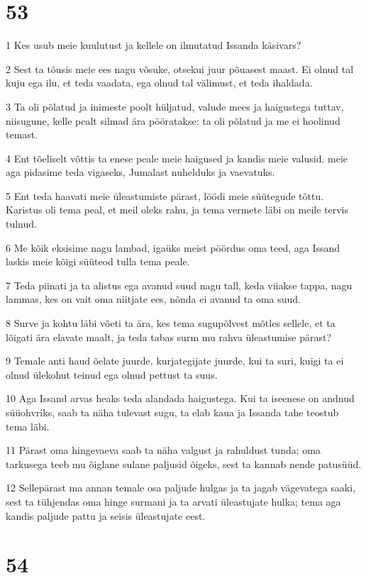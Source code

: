 \chapter{53}

\par 1 Kes usub meie kuulutust ja kellele on ilmutatud Issanda käsivars?
\par 2 Sest ta tõusis meie ees nagu võsuke, otsekui juur põuasest maast. Ei olnud tal kuju ega ilu, et teda vaadata, ega olnud tal välimust, et teda ihaldada.
\par 3 Ta oli põlatud ja inimeste poolt hüljatud, valude mees ja haigustega tuttav, niisugune, kelle pealt silmad ära pööratakse: ta oli põlatud ja me ei hoolinud temast.
\par 4 Ent tõeliselt võttis ta enese peale meie haigused ja kandis meie valusid. meie aga pidasime teda vigaseks, Jumalast nuhelduks ja vaevatuks.
\par 5 Ent teda haavati meie üleastumiste pärast, löödi meie süütegude tõttu. Karistus oli tema peal, et meil oleks rahu, ja tema vermete läbi on meile tervis tulnud.
\par 6 Me kõik eksisime nagu lambad, igaüks meist pöördus oma teed, aga Issand laskis meie kõigi süüteod tulla tema peale.
\par 7 Teda piinati ja ta alistus ega avanud suud nagu tall, keda viiakse tappa, nagu lammas, kes on vait oma niitjate ees, nõnda ei avanud ta oma suud.
\par 8 Surve ja kohtu läbi võeti ta ära, kes tema sugupõlvest mõtles sellele, et ta lõigati ära elavate maalt, ja teda tabas surm mu rahva üleastumise pärast?
\par 9 Temale anti haud õelate juurde, kurjategijate juurde, kui ta suri, kuigi ta ei olnud ülekohut teinud ega olnud pettust ta suus.
\par 10 Aga Issand arvas heaks teda alandada haigustega. Kui ta iseenese on andnud süüohvriks, saab ta näha tulevast sugu, ta elab kaua ja Issanda tahe teostub tema läbi.
\par 11 Pärast oma hingevaeva saab ta näha valgust ja rahuldust tunda; oma tarkusega teeb mu õiglane sulane paljusid õigeks, sest ta kannab nende patusüüd.
\par 12 Sellepärast ma annan temale osa paljude hulgas ja ta jagab vägevatega saaki, sest ta tühjendas oma hinge surmani ja ta arvati üleastujate hulka; tema aga kandis paljude pattu ja seisis üleastujate eest.

\chapter{54}


